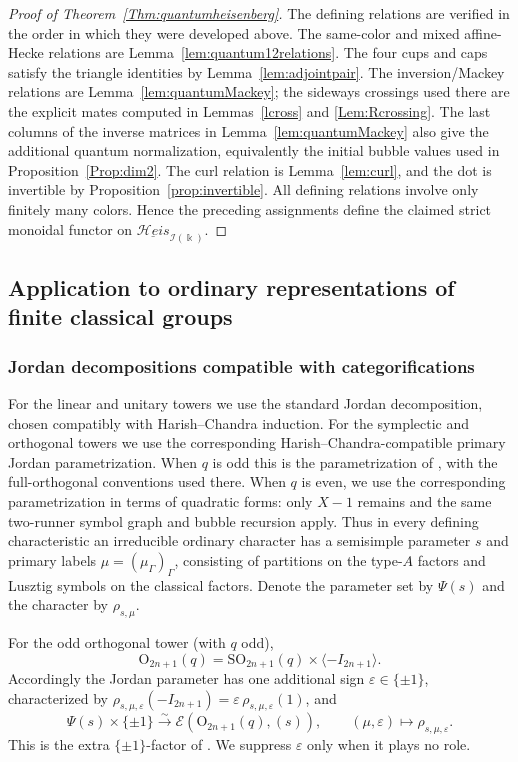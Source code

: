 \documentclass[12pt]{amsart}
\numberwithin{itemcounter}{subsection}
\theoremstyle{plain}
\theoremstyle{definition}
\theoremstyle{remark}
\numberwithin{equation}{section}
\def\k{\Bbbk}
\def\calI{\mathcal{I}}
\def\O{\mathrm{O}}
\def\SO{\mathrm{SO}}
\def\symHeis{\underline{\mathcal{H}eis}}
\begin{document}
\begin{proof}[Proof of Theorem~\ref{Thm:quantumheisenberg}]
The defining relations are verified in the order in which they were developed
above.  The same-color and mixed affine-Hecke relations are
Lemma~\ref{lem:quantum12relations}.  The four cups and caps satisfy the
triangle identities by Lemma~\ref{lem:adjointpair}.  The inversion/Mackey
relations are Lemma~\ref{lem:quantumMackey}; the sideways crossings used there
are the explicit mates computed in Lemmas~\ref{lcross} and
\ref{Lem:Rcrossing}.  The last columns of the inverse matrices in
Lemma~\ref{lem:quantumMackey} also give the additional quantum normalization,
equivalently the initial bubble values used in Proposition~\ref{Prop:dim2}.
The curl relation is Lemma~\ref{lem:curl}, and the dot is invertible by
Proposition~\ref{prop:invertible}.  All defining relations involve only finitely many colors.  Hence the
preceding assignments define the claimed strict monoidal functor on
$\symHeis_{\calI(\k)}$.
\end{proof}

\subsection{Application to ordinary representations of finite classical groups}
\subsubsection{Jordan decompositions compatible with categorifications}\label{subsec:jordan}

For the linear and unitary towers we use the standard Jordan decomposition,
chosen compatibly with Harish--Chandra induction.  For the symplectic and
orthogonal towers we use the corresponding Harish--Chandra-compatible primary
Jordan parametrization.  When $q$ is odd this is the parametrization of
\cite[Theorem~4.4]{LSZ25}, with the full-orthogonal conventions used there.
When $q$ is even, we use the corresponding parametrization in terms of quadratic forms: only $X-1$ remains and the same two-runner symbol graph and bubble recursion apply.  Thus in every defining characteristic an
irreducible ordinary character has a semisimple parameter $s$ and primary
labels $\mu=(\mu_\Gamma)_\Gamma$, consisting of partitions on the type-$A$
factors and Lusztig symbols on the classical factors.  Denote
the parameter set by $\Psi(s)$ and the character by $\rho_{s,\mu}$.

For the odd orthogonal tower (with \(q\) odd),
\[
 \O_{2n+1}(q)=\SO_{2n+1}(q)\times\langle-I_{2n+1}\rangle.
\]
Accordingly the Jordan parameter has one additional sign
\(\varepsilon\in\{\pm1\}\), characterized by
\(\rho_{s,\mu,\varepsilon}(-I_{2n+1})=\varepsilon\,\rho_{s,\mu,\varepsilon}(1)\),
and
\[
 \Psi(s)\times\{\pm1\}\xrightarrow{\sim}\mathcal E(\O_{2n+1}(q),(s)),
 \qquad(\mu,\varepsilon)\longmapsto\rho_{s,\mu,\varepsilon}.
\]
This is the extra \(\{\pm1\}\)-factor of
\cite[\S4.1.7]{LSZ25}.  We suppress \(\varepsilon\) only when it plays no role.
\end{document}
